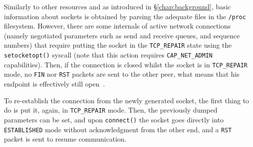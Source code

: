 Similarly to other resources and as introduced in \S\ref{chap:background}, basic information about sockets is obtained by parsing the adequate files in the \texttt{/proc} filesystem.
However, there are some internals of active network connections (namely negotiated parameters such as send and receive queues, and sequence numbers) that require putting the socket in the \texttt{TCP\_REPAIR} state using the \texttt{setocketopt()} syscall (note that this action requires \texttt{CAP\_NET\_ADMIN} capabilities).
Then, if the connection is closed whilst the socket is in \texttt{TCP\_REPAIR} mode, no \texttt{FIN} nor \texttt{RST} packets are sent to the other peer, what means that his endpoint is effectively still open~\cite{Corbet12}.

To re-establish the connection from the newly generated socket, the first thing to do is put it, again, in \texttt{TCP\_REPAIR} mode.
Then, the previously dumped parameters can be set, and upon \texttt{connect()} the socket goes directly into \texttt{ESTABLISHED} mode without acknowledgment from the other end, and a \texttt{RST} packet is sent to resume communication.

